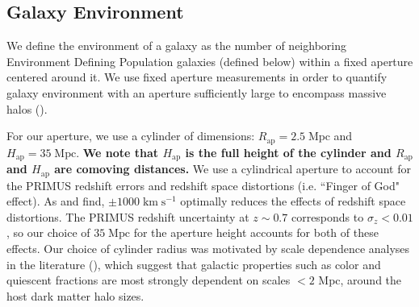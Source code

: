 \documentclass{emulateapj}
\def \apradius{2.5}
\def \apheight{35}
\begin{document}
\subsection{Galaxy Environment} \label{sec:environment}
We define the environment of a galaxy as the number of neighboring Environment Defining Population galaxies (defined below) within a fixed aperture centered around it. We use fixed aperture measurements in order to quantify galaxy environment with an aperture sufficiently large to encompass massive halos (\citealt{Muldrew:2012aa, Skibba:2013aa}).

For our aperture, we use a cylinder of dimensions: $R_{\mathrm{ap}} = \apradius\;
\mathrm{Mpc}$ and $H_{\mathrm{ap}} = \apheight\; \mathrm{Mpc}$. 
{\bf We note that $H_\mathrm{ap}$ is the full height of the cylinder and $R_\mathrm{ap}$ 
and $H_\mathrm{ap}$ are comoving distances.} We use a
cylindrical aperture to account for the PRIMUS redshift
errors and redshift space distortions (i.e. ``Finger of God"
effect). As \cite{Cooper:2005aa} and \cite{Gallazzi:2009aa} find, 
$\pm 1000 \; \mathrm{km} \;\mathrm{s^{-1}}$ optimally reduces the effects of redshift space
distortions. The PRIMUS redshift uncertainty at $z \sim 0.7$
corresponds to $\sigma_z < 0.01$, so our choice of $\apheight\;
\mathrm{Mpc}$ for the aperture height accounts for both of these effects. Our choice of
cylinder radius was motivated by scale dependence analyses in the
literature (\citealt{Blanton:2006aa, Wilman:2010aa, Muldrew:2012aa}),
which suggest that galactic properties such as color and quiescent
fractions are most strongly dependent on scales $< 2$ Mpc, around the
host dark matter halo sizes.


\end{document}
